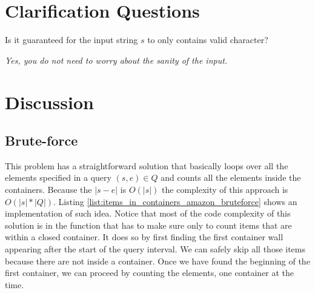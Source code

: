 \section{Clarification Questions}

\begin{QandA}
	\item Is it guaranteed for the input string $s$ to only contains valid character?
	\begin{answered}
		\textit{Yes, you do not need to worry about the sanity of the input.}
	\end{answered}
\end{QandA}

\section{Discussion}
\label{items_in_containers_amazon:sec:discussion}



\subsection{Brute-force}
\label{items_in_containers_amazon:sec:bruteforce}
This problem has a straightforward solution that basically loops over all the elements  specified in
a query $(s,e) \in Q$ and counts all the elements inside the containers. Because the $|s-e|$ is
$O(|s|)$ the complexity of this approach is $O(|s|*|Q|)$. Listing
\ref{list:items_in_containers_amazon_bruteforce} shows an implementation of such idea. Notice that
most of the code complexity of this solution is in the  function
that has to make sure only to count items that are within a closed container. It does so by first
finding the first container wall appearing after the start of the query interval. We can safely skip
all those items because there are not inside a container. Once we have found the beginning of the
first container, we can proceed by counting the elements, one container   at the time. 


